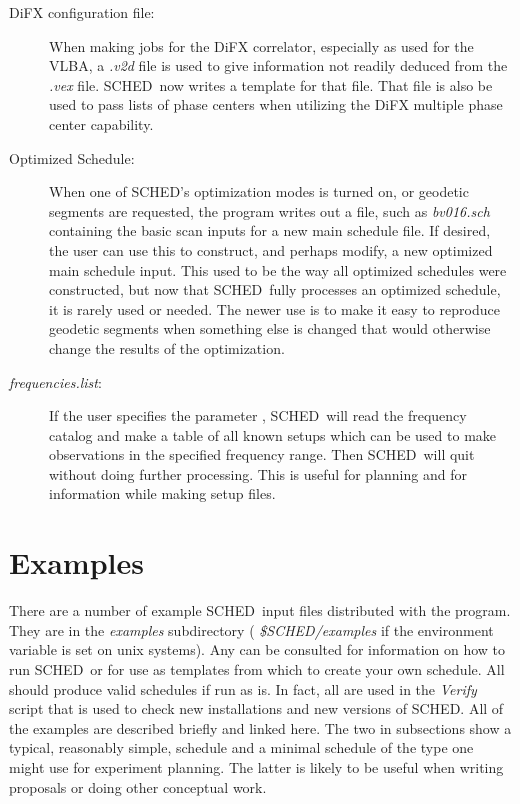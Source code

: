 \documentclass{report}
\newcommand{\sched}{{\sc SCHED}}
\newcommand{\schedb}{{\sc SCHED~}}
\begin{document}
\begin{description}
\item[DiFX configuration file:]  When making jobs for the DiFX
correlator, especially as used for the VLBA, a {\sl .v2d} file is
used to give information not readily deduced from the {\sl .vex}
file.  \schedb now writes a template for that file.  That file is
also be used to pass lists of phase centers when utilizing the DiFX
multiple phase center capability.

\item[Optimized Schedule:] When one of \sched's optimization modes is
turned on, or geodetic segments are requested, the program writes out
a file, such as {\sl bv016.sch} containing the basic scan inputs for a
new main schedule file.  If desired, the user can use this to
construct, and perhaps modify, a new optimized main schedule input.
This used to be the way all optimized schedules were constructed, but
now that \schedb fully processes an optimized schedule, it is rarely
used or needed.  The newer use is to make it easy to reproduce
geodetic segments when something else is changed that would otherwise
change the results of the optimization.

\item[{\sl frequencies.list}:]  If the user specifies the parameter
, \schedb will read the
frequency catalog and make a table of all known setups which can
be used to make observations in the specified frequency range.  Then
\schedb will quit without doing further processing.  This is useful
for planning and for information while making setup files.

\end{description}




\section{\label{SEC:EXAMPLES}Examples}

There are a number of example \schedb input files distributed with the
program.  They are in the {\sl examples} subdirectory ({\sl
\$SCHED/examples} if the environment variable is set on unix systems).
Any can be consulted for information on how to run \schedb or for use
as templates from which to create your own schedule.  All should
produce valid schedules if run as is.  In fact, all are used in the
{\sl Verify} script that is used to check new installations and new
versions of \sched.  All of the examples are described briefly and
linked here.  The two in subsections show a typical, reasonably simple,
schedule and a minimal schedule of the type one might use for
experiment planning.  The latter is likely to be useful when writing
proposals or doing other conceptual work.
\end{document}
